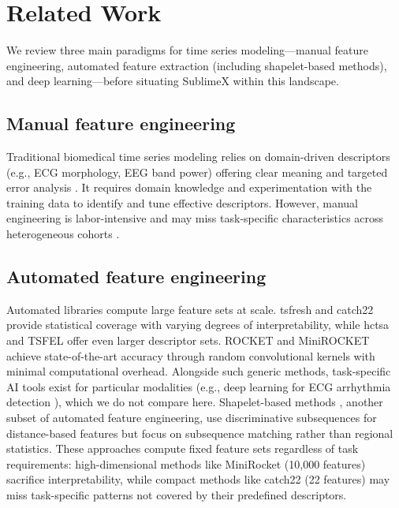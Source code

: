 \documentclass[times, review, 10pt]{elsarticle}
\begin{document}
\section{Related Work}

We review three main paradigms for time series modeling---manual feature engineering,
automated feature extraction (including shapelet-based methods), and deep learning---before
situating SublimeX within this landscape.

\subsection{Manual feature engineering}
Traditional biomedical time series modeling relies on domain-driven descriptors (e.g., ECG
morphology, EEG band power) offering clear meaning and targeted error analysis
\cite{woldaregay2019data, fulcher2018feature}. It requires domain knowledge and experimentation with the training data to identify and tune effective descriptors. 
However, manual engineering is labor-intensive
and may miss task-specific characteristics across heterogeneous cohorts \cite{miotto2018deep}.


\subsection{Automated feature engineering}
Automated libraries compute large feature sets at scale. tsfresh
\cite{christ2018tsfresh} and catch22 \cite{lubba2019catch22} provide statistical coverage with
varying degrees of interpretability, while hctsa and TSFEL \cite{fulcher2017hctsa,
barandas2020tsfel} offer even larger descriptor sets. ROCKET and MiniROCKET
\cite{dempster2020rocket, dempster2021minirocket} achieve state-of-the-art accuracy through
random convolutional kernels with minimal computational overhead. Alongside such generic
methods, task-specific AI tools exist for particular modalities (e.g., deep learning for ECG arrhythmia detection \cite{yildirim2018arrhythmia}),
which we do not compare here. Shapelet-based methods \cite{hills2014shapelet, guillaume2022random}, another subset of automated feature engineering, use discriminative subsequences for distance-based features but focus on subsequence matching rather than regional statistics. These approaches compute fixed feature sets
regardless of task requirements: high-dimensional methods like MiniRocket (10,000 features)
sacrifice interpretability, while compact methods like catch22 (22 features) may miss
task-specific patterns not covered by their predefined descriptors.
\end{document}
